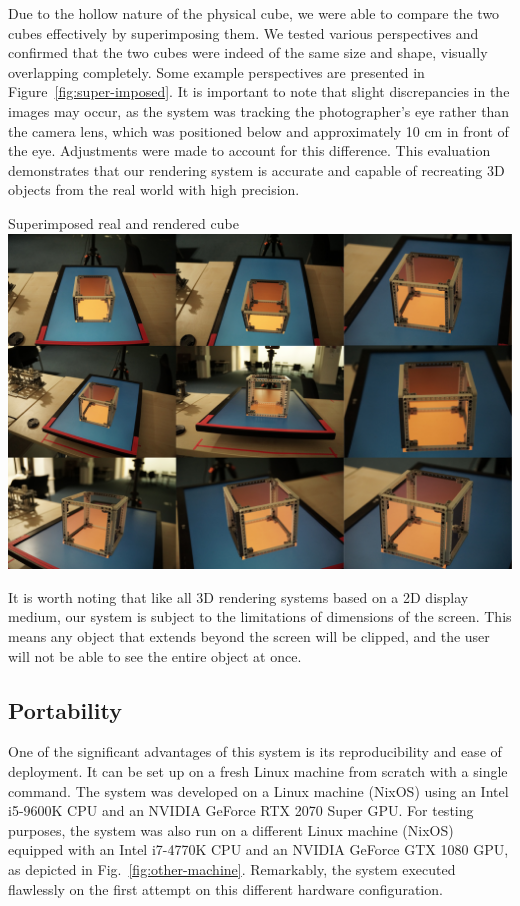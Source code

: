 Due to the hollow nature of the physical cube, we were able to compare the two cubes effectively by superimposing them. We tested various perspectives and confirmed that the two cubes were indeed of the same size and shape, visually overlapping completely. Some example perspectives are presented in Figure~\ref{fig:super-imposed}. It is important to note that slight discrepancies in the images may occur, as the system was tracking the photographer's eye rather than the camera lens, which was positioned below and approximately 10 cm in front of the eye. Adjustments were made to account for this difference. This evaluation demonstrates that our rendering system is accurate and capable of recreating 3D objects from the real world with high precision.

\begin{figureBox}[label={fig:super-imposed}, width=0.8\linewidth]{Superimposed real and rendered cube}
	\includegraphics[width = 1.0\linewidth]{./evaluation/figures/super-imposed.pdf}
\end{figureBox}

It is worth noting that like all 3D rendering systems based on a 2D display medium, our system is subject to the limitations of dimensions of the screen. This means any object that extends beyond the screen will be clipped, and the user will not be able to see the entire object at once.

\subsection{Portability}
One of the significant advantages of this system is its reproducibility and ease of deployment. It can be set up on a fresh Linux machine from scratch with a single command. The system was developed on a Linux machine (NixOS) using an Intel i5-9600K CPU and an NVIDIA GeForce RTX 2070 Super GPU. For testing purposes, the system was also run on a different Linux machine (NixOS) equipped with an Intel i7-4770K CPU and an NVIDIA GeForce GTX 1080 GPU, as depicted in Fig.~\ref{fig:other-machine}. Remarkably, the system executed flawlessly on the first attempt on this different hardware configuration.


